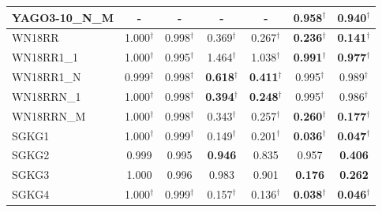 \begin{table}[t]
{\begin{tabular}{l||cc||cc||cc}
YAGO3-10\_N\_M & - & - & - & - & \textbf{0.958}$^\dagger$ & \textbf{0.940}$^\dagger$ \\
\hline
WN18RR & 1.000$^\dagger$ & 0.998$^\dagger$ & 0.369$^\dagger$ & 0.267$^\dagger$ & \textbf{0.236}$^\dagger$ & \textbf{0.141}$^\dagger$ \\
WN18RR1\_1 & 1.000$^\dagger$ & 0.995$^\dagger$ & 1.464$^\dagger$ & 1.038$^\dagger$ & \textbf{0.991}$^\dagger$ & \textbf{0.977}$^\dagger$ \\
WN18RR1\_N & 0.999$^\dagger$ & 0.998$^\dagger$ & \textbf{0.618}$^\dagger$ & \textbf{0.411}$^\dagger$ & 0.995$^\dagger$ & 0.989$^\dagger$ \\
WN18RRN\_1 & 1.000$^\dagger$ & 0.998$^\dagger$ & \textbf{0.394}$^\dagger$ & \textbf{0.248}$^\dagger$ & 0.995$^\dagger$ & 0.986$^\dagger$ \\
WN18RRN\_M & 1.000$^\dagger$ & 0.998$^\dagger$ & 0.343$^\dagger$ & 0.257$^\dagger$ & \textbf{0.260}$^\dagger$ & \textbf{0.177}$^\dagger$ \\
\hline
SGKG1 & 1.000$^\dagger$ & 0.999$^\dagger$ & 0.149$^\dagger$ & 0.201$^\dagger$ & \textbf{0.036}$^\dagger$ & \textbf{0.047}$^\dagger$ \\
SGKG2 & 0.999 & 0.995 & \textbf{0.946} & 0.835 & 0.957 & \textbf{0.406} \\
SGKG3 & 1.000 & 0.996 & 0.983 & 0.901 & \textbf{0.176} & \textbf{0.262} \\
SGKG4 & 1.000$^\dagger$ & 0.999$^\dagger$ & 0.157$^\dagger$ & 0.136$^\dagger$ & \textbf{0.038}$^\dagger$ & \textbf{0.046}$^\dagger$ \\
\hline
\end{tabular}%
}
\end{table}
